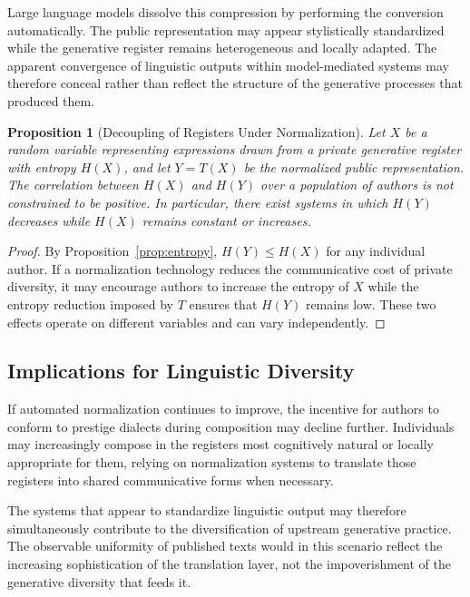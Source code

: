 \documentclass[12pt,a4paper]{article}
\theoremstyle{definition}
\theoremstyle{plain}
\newtheorem{proposition}[definition]{Proposition}
\theoremstyle{remark}
\begin{document}
Large language models dissolve this compression by performing the conversion automatically.
The public representation may appear stylistically standardized while the generative register
remains heterogeneous and locally adapted. The apparent convergence of linguistic outputs
within model-mediated systems may therefore conceal rather than reflect the structure of the
generative processes that produced them.

\begin{proposition}[Decoupling of Registers Under Normalization]
\label{prop:decouple}
Let $X$ be a random variable representing expressions drawn from a private generative
register with entropy $H(X)$, and let $Y = T(X)$ be the normalized public representation.
The correlation between $H(X)$ and $H(Y)$ over a population of authors is not constrained
to be positive. In particular, there exist systems in which $H(Y)$ decreases while $H(X)$
remains constant or increases.
\end{proposition}

\begin{proof}
By Proposition~\ref{prop:entropy}, $H(Y) \leq H(X)$ for any individual author. If a
normalization technology reduces the communicative cost of private diversity, it may encourage
authors to increase the entropy of $X$ while the entropy reduction imposed by $T$ ensures
that $H(Y)$ remains low. These two effects operate on different variables and can vary
independently.
\end{proof}

\subsection{Implications for Linguistic Diversity}

If automated normalization continues to improve, the incentive for authors to conform to
prestige dialects during composition may decline further. Individuals may increasingly
compose in the registers most cognitively natural or locally appropriate for them, relying on
normalization systems to translate those registers into shared communicative forms when
necessary.

The systems that appear to standardize linguistic output may therefore simultaneously
contribute to the diversification of upstream generative practice. The observable uniformity
of published texts would in this scenario reflect the increasing sophistication of the
translation layer, not the impoverishment of the generative diversity that feeds it.
\end{document}
